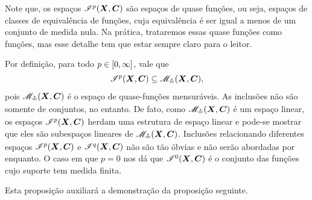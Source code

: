 Note que, os espaços $\mathscr{I}^p(\bm X,\bm C)$ são espaços de quase funções, ou seja, espaços de classes de equivalência de funções, cuja equivalência é ser igual a menos de um conjunto de medida nula. Na prática, trataremos essas quase funções como funções, mas esse detalhe tem que estar sempre claro para o leitor.

Por definição, para todo $p \in \left[0,\allowbreak \infty\right]$, vale que
	\begin{equation*}
	\mathscr{I}^p(\bm X,\bm C) \subseteq \mathscr{M}_{\circeq}(\bm X,\bm C),
	\end{equation*}
pois $\mathscr{M}_{\circeq}(\bm X,\bm C)$ é o espaço de quase-funções mensuráveis. As inclusões não são somente de conjuntos, no entanto. De fato, como $\mathscr{M}_{\circeq}(\bm X,\bm C)$ é um espaço linear, os espaços $\mathscr{I}^p(\bm X,\bm C)$ herdam uma estrutura de espaço linear e pode-se mostrar que eles são subespaços lineares de $\mathscr{M}_{\circeq}(\bm X,\bm C)$. Inclusões relacionando diferentes espaços $\mathscr{I}^p(\bm X,\bm C)$ e $\mathscr{I}^q(\bm X,\bm C)$ não são tão óbvias e não serão abordadas por enquanto. O caso em que $p=0$ nos dá que $\mathscr{I}^0(\bm X,\bm C)$ é o conjunto das funções cujo suporte tem medida finita.

Esta proposição auxiliará a demonstração da proposição seguinte.

